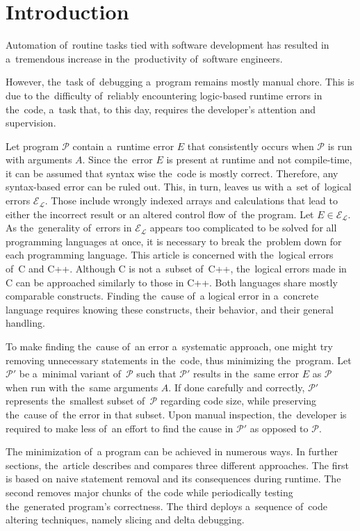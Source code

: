 \chapter*{Introduction}


Automation of~routine tasks tied with software development has resulted in a~tremendous
increase in the~productivity of~software engineers. 

However, the~task of~debugging a~program
remains mostly manual chore. 
This is due to the~difficulty of~reliably encountering logic-based
runtime errors in the~code, a~task that, to this day, requires 
the developer's attention and supervision.

Let program $\mathcal{P}$ contain a~runtime error $E$ 
that consistently occurs when $\mathcal{P}$ is run 
with arguments $A$.
Since the~error $E$ is present at runtime and not compile-time,
it can be assumed that syntax wise the~code is mostly correct.
Therefore, any syntax-based error can be ruled out.
This, in turn, leaves us with a~set of~logical errors $\mathcal{E_L}$.
Those include wrongly indexed arrays and calculations that lead to either
the incorrect result or an altered control flow of~the program. 
Let $E \in \mathcal{E_L}$. As the~generality of~errors in $\mathcal{E_L}$
appears too complicated to be solved for all programming languages at once, 
it is necessary to break the~problem down for each programming language. 
This article is concerned with the~logical errors of~C and C++.
Although C is not a~subset of~C++, the~logical errors made in C can be
approached similarly to those in C++.
Both languages share mostly comparable constructs.
Finding the~cause of~a logical error in a~concrete language requires knowing
these constructs, their behavior, and their general handling.

To make finding the~cause of~an error a~systematic approach, one might try removing
unnecessary statements in the~code, thus minimizing the~program.
Let $\mathcal{P'}$ be a~minimal variant of~$\mathcal{P}$ such 
that $\mathcal{P'}$ results in the~same error $E$ as $\mathcal{P}$
when run with the~same arguments $A$.
If done carefully and correctly, $\mathcal{P'}$ represents the~smallest 
subset of~$\mathcal{P}$ regarding code
size, while preserving the~cause of~the error in that subset.
Upon manual inspection, the~developer is required to make less of~an effort to find
the cause in $\mathcal{P'}$ as opposed to $\mathcal{P}$.

The minimization of~a program can be achieved in numerous ways.
In further sections, the~article describes and compares three different approaches.
The first is based on naive statement removal and its consequences during runtime.
The second removes major chunks of~the code while
periodically testing the~generated program's correctness.
The third deploys a~sequence of~code
altering techniques, namely slicing and delta debugging.


